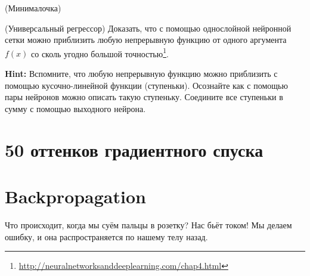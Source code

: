 \documentclass[12pt, a4paper, oneside]{article}
\theoremstyle{plain} %
\theoremstyle{definition}
\begin{document}
\begin{problem}{(Минималочка)}
\begin{minipage}{0.3\linewidth}
\begin{center}
\end{center} 
\end{minipage} 

\end{problem}


\begin{problem}{(Универсальный регрессор)}
Доказать, что с помощью однослойной нейронной сетки можно приблизить любую непрерывную функцию от одного аргумента $f(x)$ со сколь угодно большой точностью\footnote{\url{http://neuralnetworksanddeeplearning.com/chap4.html}}.  

\textbf{Hint:}  Вспомните, что любую непрерывную функцию можно приблизить с помощью кусочно-линейной функции (ступеньки). Осознайте как с помощью пары нейронов можно описать такую ступеньку. Соедините все ступеньки в сумму с помощью выходного нейрона. 
\end{problem}



\section{50 оттенков градиентного спуска}




\section{Backpropagation}


Что происходит, когда мы суём пальцы в розетку? Нас бьёт током! Мы делаем ошибку, и она распространяется по нашему телу назад. 
\end{document}
